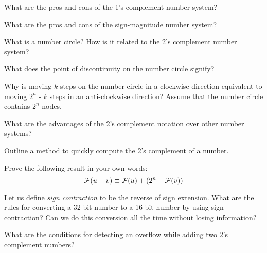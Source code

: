 \begin{ExerciseList}
\Exercise
What are the pros and cons of the 1's complement number system?

\Exercise
What are the pros and cons of the sign-magnitude number system?

\Exercise
What is a number circle? How is it related to the 2's complement number system? 

\Exercise
What does the point of discontinuity on the number circle signify?

\Exercise 
Why is moving $k$ steps on the number circle in a clockwise direction
equivalent to moving $2^n$ - $k$ steps in an anti-clockwise direction? 
Assume that the number circle contains $2^n$ nodes.

\Exercise
What are the advantages of the 2's complement notation over other number systems?

\Exercise
Outline a method to quickly compute the 2's complement of a number.

\Exercise
Prove the following result in your own words:
    \begin{equation}
		\mathcal{F}(u - v) \equiv \mathcal{F}(u) + (2^n - \mathcal{F}(v))
	\end{equation}

\Exercise
Let us define {\em sign contraction} to be the reverse of sign extension. What are the rules
for converting a 32 bit number to a 16 bit number by using sign contraction? Can we do this
conversion all the time without losing information?

\Exercise
What are the conditions for detecting an overflow while adding two 2's complement numbers?

\end{ExerciseList}

